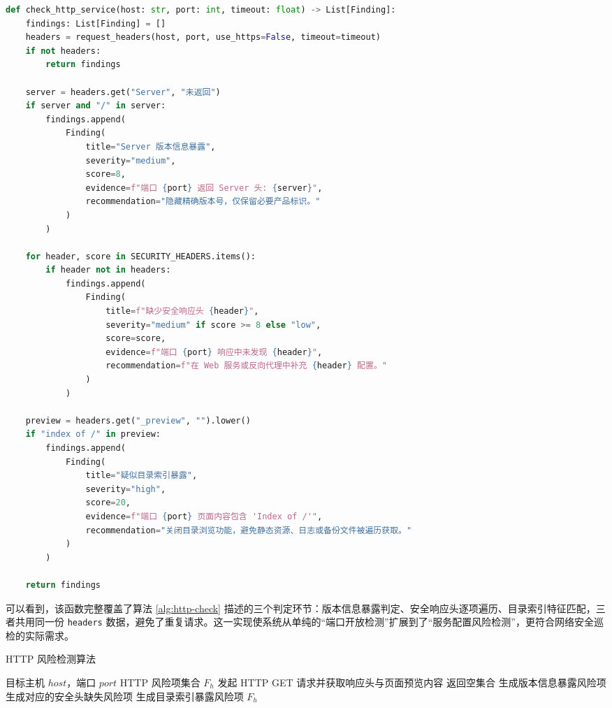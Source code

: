 \documentclass[12pt,a4paper,fontset=none]{ctexart}
\begin{document}
\begin{lstlisting}[language=Python,caption={HTTP 风险检测逻辑}]
def check_http_service(host: str, port: int, timeout: float) -> List[Finding]:
    findings: List[Finding] = []
    headers = request_headers(host, port, use_https=False, timeout=timeout)
    if not headers:
        return findings

    server = headers.get("Server", "未返回")
    if server and "/" in server:
        findings.append(
            Finding(
                title="Server 版本信息暴露",
                severity="medium",
                score=8,
                evidence=f"端口 {port} 返回 Server 头: {server}",
                recommendation="隐藏精确版本号，仅保留必要产品标识。"
            )
        )

    for header, score in SECURITY_HEADERS.items():
        if header not in headers:
            findings.append(
                Finding(
                    title=f"缺少安全响应头 {header}",
                    severity="medium" if score >= 8 else "low",
                    score=score,
                    evidence=f"端口 {port} 响应中未发现 {header}",
                    recommendation=f"在 Web 服务或反向代理中补充 {header} 配置。"
                )
            )

    preview = headers.get("_preview", "").lower()
    if "index of /" in preview:
        findings.append(
            Finding(
                title="疑似目录索引暴露",
                severity="high",
                score=20,
                evidence=f"端口 {port} 页面内容包含 'Index of /'",
                recommendation="关闭目录浏览功能，避免静态资源、日志或备份文件被遍历获取。"
            )
        )

    return findings
\end{lstlisting}

可以看到，该函数完整覆盖了算法 \ref{alg:http-check} 描述的三个判定环节：版本信息暴露判定、安全响应头逐项遍历、目录索引特征匹配，三者共用同一份 \texttt{headers} 数据，避免了重复请求。这一实现使系统从单纯的“端口开放检测”扩展到了“服务配置风险检测”，更符合网络安全巡检的实际需求。

\begin{algorithm}[H]
\caption{HTTP 风险检测算法}
\label{alg:http-check}
\begin{algorithmic}[1]
\Require 目标主机 $host$，端口 $port$
\Ensure HTTP 风险项集合 $F_h$
\State 发起 HTTP GET 请求并获取响应头与页面预览内容
  \State 返回空集合
\EndIf
{}
  \State 生成版本信息暴露风险项
\EndIf
{}
    \State 生成对应的安全头缺失风险项
  \EndIf
\EndFor
{}
  \State 生成目录索引暴露风险项
\EndIf
\State \Return $F_h$
\end{algorithmic}
\end{algorithm}
\end{document}
